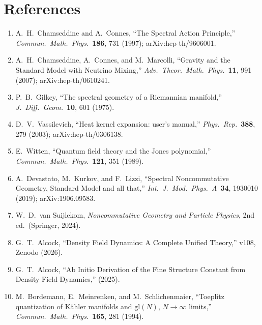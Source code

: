 \documentclass[12pt,a4paper]{article}
\begin{document}
\section*{References}

\begin{enumerate}
\item[{[1]}] A.~H.~Chamseddine and A.~Connes, ``The Spectral Action
Principle,'' \textit{Commun.\ Math.\ Phys.}\ \textbf{186}, 731 (1997);
arXiv:hep-th/9606001. \label{ref:CC1996}

\item[{[2]}] A.~H.~Chamseddine, A.~Connes, and M.~Marcolli, ``Gravity and
the Standard Model with Neutrino Mixing,'' \textit{Adv.\ Theor.\ Math.\
Phys.}\ \textbf{11}, 991 (2007); arXiv:hep-th/0610241. \label{ref:CCM2007}

\item[{[3]}] P.~B.~Gilkey, ``The spectral geometry of a Riemannian manifold,''
\textit{J.\ Diff.\ Geom.}\ \textbf{10}, 601 (1975). \label{ref:Gilkey}

\item[{[4]}] D.~V.~Vassilevich, ``Heat kernel expansion: user's manual,''
\textit{Phys.\ Rep.}\ \textbf{388}, 279 (2003); arXiv:hep-th/0306138.
\label{ref:Vassilevich}

\item[{[5]}] E.~Witten, ``Quantum field theory and the Jones polynomial,''
\textit{Commun.\ Math.\ Phys.}\ \textbf{121}, 351 (1989). \label{ref:Witten}

\item[{[6]}] A.~Devastato, M.~Kurkov, and F.~Lizzi, ``Spectral Noncommutative
Geometry, Standard Model and all that,'' \textit{Int.\ J.\ Mod.\ Phys.\ A}\
\textbf{34}, 1930010 (2019); arXiv:1906.09583. \label{ref:DKL}

\item[{[7]}] W.~D.~van Suijlekom, \textit{Noncommutative Geometry and
Particle Physics}, 2nd ed.\ (Springer, 2024). \label{ref:vS}

\item[{[8]}] G.~T.~Alcock, ``Density Field Dynamics: A Complete Unified
Theory,'' v108, Zenodo (2026). \label{ref:DFD}

\item[{[9]}] G.~T.~Alcock, ``Ab Initio Derivation of the Fine Structure
Constant from Density Field Dynamics,'' (2025). \label{ref:AbInitio}

\item[{[10]}] M.~Bordemann, E.~Meinrenken, and M.~Schlichenmaier,
``Toeplitz quantization of K\"ahler manifolds and $\mathrm{gl}(N)$, $N
\to \infty$ limits,'' \textit{Commun.\ Math.\ Phys.}\ \textbf{165}, 281
(1994). \label{ref:BMS}
\end{enumerate}
\end{document}
